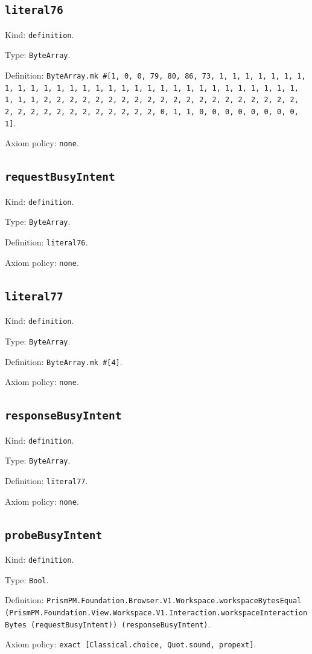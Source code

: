 \documentclass[11pt]{article}
\begin{document}
\subsection*{\texttt{literal76}}
\noindent Kind: \texttt{definition}.\par
\noindent Type: \texttt{ByteArray}.\par
\noindent Definition: \texttt{ByteArray.mk \#[1, 0, 0, 79, 80, 86, 73, 1, 1, 1, 1, 1, 1, 1, 1, 1, 1, 1, 1, 1, 1, 1, 1, 1, 1, 1, 1, 1, 1, 1, 1, 1, 1, 1, 1, 1, 1, 1, 1, 1, 2, 2, 2, 2, 2, 2, 2, 2, 2, 2, 2, 2, 2, 2, 2, 2, 2, 2, 2, 2, 2, 2, 2, 2, 2, 2, 2, 2, 2, 2, 2, 2, 0, 1, 1, 0, 0, 0, 0, 0, 0, 0, 0, 1]}.\par
\noindent Axiom policy: \texttt{none}.\par
\subsection*{\texttt{requestBusyIntent}}
\noindent Kind: \texttt{definition}.\par
\noindent Type: \texttt{ByteArray}.\par
\noindent Definition: \texttt{literal76}.\par
\noindent Axiom policy: \texttt{none}.\par
\subsection*{\texttt{literal77}}
\noindent Kind: \texttt{definition}.\par
\noindent Type: \texttt{ByteArray}.\par
\noindent Definition: \texttt{ByteArray.mk \#[4]}.\par
\noindent Axiom policy: \texttt{none}.\par
\subsection*{\texttt{responseBusyIntent}}
\noindent Kind: \texttt{definition}.\par
\noindent Type: \texttt{ByteArray}.\par
\noindent Definition: \texttt{literal77}.\par
\noindent Axiom policy: \texttt{none}.\par
\subsection*{\texttt{probeBusyIntent}}
\noindent Kind: \texttt{definition}.\par
\noindent Type: \texttt{Bool}.\par
\noindent Definition: \texttt{PrismPM.Foundation.Browser.V1.Workspace.workspaceBytesEqual (PrismPM.Foundation.View.Workspace.V1.Interaction.workspaceInteractionBytes (requestBusyIntent)) (responseBusyIntent)}.\par
\noindent Axiom policy: \texttt{exact [Classical.choice, Quot.sound, propext]}.\par
\end{document}
